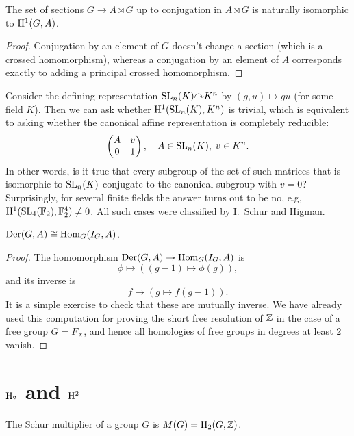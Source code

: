 \begin{cor}
    The set of sections $G\to A\rtimes G$ up to conjugation in $A\rtimes G$ is naturally isomorphic to $\mathrm{H}^1(G,A)$.
\end{cor}
\begin{proof}
    Conjugation by an element of $G$ doesn't change a section (which is a crossed homomorphism), whereas a conjugation by an element of $A$ corresponds exactly to adding a principal crossed homomorphism.
\end{proof}

\begin{example}
    Consider the defining representation $\SL_n(K)\acts K^n$ by $(g,u)\mapsto gu$ (for some field $K$). Then we can ask whether $\mathrm{H}^1(\operatorname{SL}_n(K),K^n)$ is trivial, which is equivalent to asking whether the canonical affine representation is completely reducible:
    \[\begin{pmatrix}
        A&v\\
        0&1
    \end{pmatrix},\quad A\in \operatorname{SL}_n(K),\;v\in K^n.\]
    In other words, is it true that every subgroup of the set of such matrices that is isomorphic to $\operatorname{SL}_n(K)$ conjugate to the canonical subgroup with $v=0$? Surprisingly, for several finite fields the answer turns out to be no, e.g, $\mathrm{H}^1(\operatorname{SL}_4(\mathbb{F}_2),\mathbb{F}_2^4)\neq 0$. All such cases were classified by I.~Schur and Higman.
\end{example}

\begin{prop}
    $\operatorname{Der}(G,A)\cong \operatorname{Hom}_G(I_G,A)$.
\end{prop}
\begin{proof}
    The homomorphism $\operatorname{Der}(G,A)\to \operatorname{Hom}_G(I_G,A)$ is
    \[\phi\mapsto ((g-1)\mapsto \phi(g)),\]
    and its inverse is
    \[f\mapsto (g\mapsto f(g-1)).\]
    It is a simple exercise to check that these are mutually inverse. We have already used this computation for proving the short free resolution of $\mathbb{Z}$ in the case of a free group $G=F_X$, and hence all homologies of free groups in degrees at least $2$ vanish.
\end{proof}

\section{\texorpdfstring{$\mathrm{H}_2$}{H2} and \texorpdfstring{$\mathrm{H}^2$}{H2}}


\begin{defn}
    The Schur multiplier of a group $G$ is $M(G)=\mathrm{H}_2(G,\mathbb{Z})$.
\end{defn}

